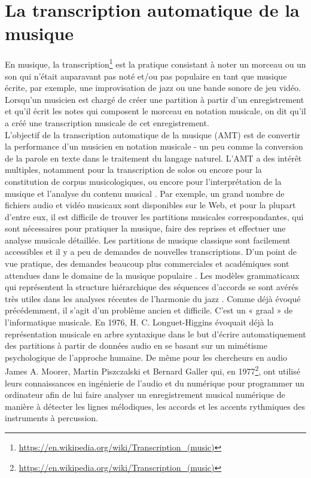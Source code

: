 \section{La transcription automatique de la musique}
En musique, la transcription\footnote{\url{https://en.wikipedia.org/wiki/Transcription_(music)}} est la pratique consistant à noter un morceau ou un son qui n'était auparavant pas noté et/ou pas populaire en tant que musique écrite, par exemple, une improvisation de jazz ou une bande sonore de jeu vidéo. Lorsqu'un musicien est chargé de créer une partition à partir d'un enregistrement et qu'il écrit les notes qui composent le morceau en notation musicale, on dit qu'il a créé une transcription musicale de cet enregistrement.\\
L'objectif de la transcription automatique de la musique (AMT) \cite{future_directions} est de convertir la performance d'un musicien en notation musicale - un peu comme la conversion de la parole en texte dans le traitement du langage naturel. L’AMT a des intérêt multiples, notamment pour la transcription de solos ou encore pour la constitution de corpus musicologiques, ou encore pour l'interprétation de la musique et l'analyse du contenu musical \cite{SHIBATA2021262}. Par exemple, un grand nombre de fichiers audio et vidéo musicaux sont disponibles sur le Web, et pour la plupart d'entre eux, il est difficile de trouver les partitions musicales correspondantes, qui sont nécessaires pour pratiquer la musique, faire des reprises et effectuer une analyse musicale détaillée. Les partitions de musique classique sont facilement accessibles et il y a peu de demandes de nouvelles transcriptions. D'un point de vue pratique, des demandes beaucoup plus commerciales et académiques sont attendues dans le domaine de la musique populaire \cite{SHIBATA2021262}. Les modèles grammaticaux qui représentent la structure hiérarchique des séquences d'accords se sont avérés très utiles dans les analyses récentes de l'harmonie du jazz \cite{harasimjazz}.
Comme déjà évoqué précédemment, il s’agit d’un problème ancien et difficile. C’est un « graal » de l’informatique musicale. En 1976, H. C. Longuet-Higgins \cite{first_one} évoquait déjà la représentation musicale en arbre syntaxique dans le but d’écrire automatiquement des partitions à partir de données audio en se basant sur un mimétisme psychologique de l’approche humaine. De même pour les chercheurs en audio James A. Moorer, Martin Piszczalski et Bernard Galler qui, en 1977\footnote{\url{https://en.wikipedia.org/wiki/Transcription_(music)}}, ont utilisé leurs connaissances en ingénierie de l’audio et du numérique pour programmer un ordinateur afin de lui faire analyser un enregistrement musical numérique de manière à détecter les lignes mélodiques, les accords et les accents rythmiques des instruments à percussion.\\
